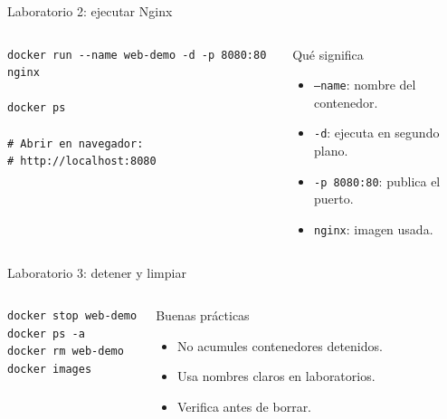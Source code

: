 \documentclass[aspectratio=169]{beamer}
\begin{document}
\begin{frame}[fragile]{Laboratorio 2: ejecutar Nginx}
  \begin{columns}[T]
\begin{lstlisting}[style=terminal]
docker run --name web-demo -d -p 8080:80 nginx

docker ps

# Abrir en navegador:
# http://localhost:8080
\end{lstlisting}
    \begin{exampleblock}{Qué significa}
      \begin{itemize}
        \item \texttt{--name}: nombre del contenedor.
        \item \texttt{-d}: ejecuta en segundo plano.
        \item \texttt{-p 8080:80}: publica el puerto.
        \item \texttt{nginx}: imagen usada.
      \end{itemize}
    \end{exampleblock}
  \end{columns}
\end{frame}

\begin{frame}[fragile]{Laboratorio 3: detener y limpiar}
  \begin{columns}[T]
\begin{lstlisting}[style=terminal]
docker stop web-demo
docker ps -a
docker rm web-demo
docker images
\end{lstlisting}
    \begin{alertblock}{Buenas prácticas}
      \begin{itemize}
        \item No acumules contenedores detenidos.
        \item Usa nombres claros en laboratorios.
        \item Verifica antes de borrar.
      \end{itemize}
    \end{alertblock}
  \end{columns}
\end{frame}
\end{document}
